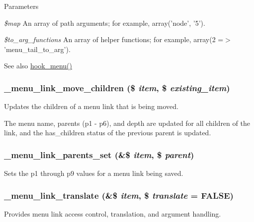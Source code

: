 \begin{DoxyParams}{Parameters}
\item[{\em \$map}]An array of path arguments; for example, array('node', '5'). \item[{\em \$to\_\-arg\_\-functions}]An array of helper functions; for example, array(2 =$>$ 'menu\_\-tail\_\-to\_\-arg').\end{DoxyParams}
\begin{DoxySeeAlso}{See also}
\hyperlink{group__hooks_ga5c95244fea59b25666e409759e133ded}{hook\_\-menu()} 
\end{DoxySeeAlso}
\hypertarget{group__menu_gaeb7542558d6fab7c79b96c1188ee6d67}{
\subsubsection[{\_\-menu\_\-link\_\-move\_\-children}]{\setlength{\rightskip}{0pt plus 5cm}\_\-menu\_\-link\_\-move\_\-children (\$ {\em item}, \/  \$ {\em existing\_\-item})}}
\label{group__menu_gaeb7542558d6fab7c79b96c1188ee6d67}
Updates the children of a menu link that is being moved.

The menu name, parents (p1 -\/ p6), and depth are updated for all children of the link, and the has\_\-children status of the previous parent is updated. \hypertarget{group__menu_ga67ab71fff6e17ce3c32752c3bfa00d96}{
\subsubsection[{\_\-menu\_\-link\_\-parents\_\-set}]{\setlength{\rightskip}{0pt plus 5cm}\_\-menu\_\-link\_\-parents\_\-set (\&\$ {\em item}, \/  \$ {\em parent})}}
\label{group__menu_ga67ab71fff6e17ce3c32752c3bfa00d96}
Sets the p1 through p9 values for a menu link being saved. \hypertarget{group__menu_ga75bf09f752589011fc9256b041cf7cc0}{
\subsubsection[{\_\-menu\_\-link\_\-translate}]{\setlength{\rightskip}{0pt plus 5cm}\_\-menu\_\-link\_\-translate (\&\$ {\em item}, \/  \$ {\em translate} = {\ttfamily FALSE})}}
\label{group__menu_ga75bf09f752589011fc9256b041cf7cc0}
Provides menu link access control, translation, and argument handling.

